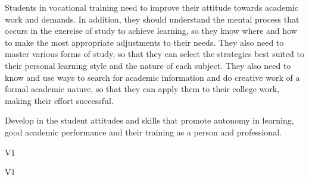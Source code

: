 \begin{syllabus}


\begin{justification}
Students in vocational training need to improve their attitude towards academic work and demands. In addition, they should understand the mental process that occurs in the exercise of study to achieve learning, so they know where and how to make the most appropriate adjustments to their needs. They also need to master various forms of study, so that they can select the strategies best suited to their personal learning style and the nature of each subject. They also need to know and use ways to search for academic information and do creative work of a formal academic nature, so that they can apply them to their college work, making their effort successful.
\end{justification}

\begin{goals}
\item Develop in the student attitudes and skills that promote autonomy in learning, good academic performance and their training as a person and professional.
\end{goals}

\begin{outcomes}{V1}
    \item {}
    \item {}
    \item {}
\end{outcomes}

\begin{competences}{V1}
    \item {}
    \item {}
\end{competences}


\end{syllabus}
